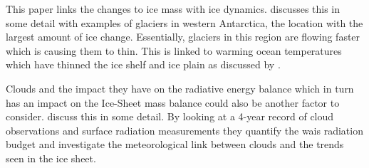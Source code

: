 \documentclass[../main.tex]{subfiles}
\begin{document}
This paper links the changes to ice mass with ice dynamics. \cite{Flament2020DynamicAltimetry} discusses this in some detail with examples of glaciers in western Antarctica, the location with the largest amount of ice change. Essentially, glaciers in this region are flowing faster which is causing them to thin. This is linked to warming ocean temperatures which have thinned the ice shelf and ice plain as discussed by \cite{corr_doake_jenkins_vaughan_2001}.

Clouds and the impact they have on the radiative energy balance which in turn has an impact on the Ice-Sheet mass balance could also be another factor to consider. \cite{Scott2017} discuss this in some detail. By looking at a 4-year record of cloud observations and surface radiation measurements they quantify the \gls{wais} radiation budget and investigate the meteorological link between clouds and the trends seen in the ice sheet.





\end{document}
